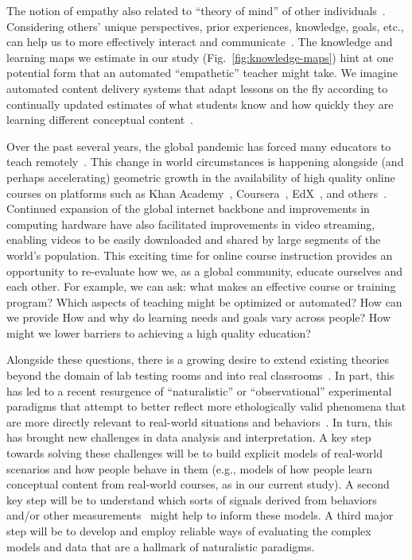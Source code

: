 \documentclass[10pt]{article}
\begin{document}
The notion of empathy also related to ``theory of mind'' of other
individuals~\citep{GoldWinn12, KansEtal15, Melt11}. Considering others' unique
perspectives, prior experiences, knowledge, goals, etc., can help us to more
effectively interact and communicate~\citep{ShaoEtal18, StepBaer06, Ratk18}.
The knowledge and learning maps we estimate in our study
(Fig.~\ref{fig:knowledge-maps}) hint at one potential form that an automated
``empathetic'' teacher might take. We imagine automated content delivery
systems that adapt lessons on the fly according to continually updated
estimates of what students know and how quickly they are learning different
conceptual content~\citep[e.g., building on ideas such as][and
others]{AndeSkwa86, Half88, Kuma05, WolzEtal88}.

Over the past several years, the global pandemic has forced many educators to
teach remotely~\citep{MoseEtal21, ShimLee20, KawaEtal21, Whal20}. This change
in world circumstances is happening alongside (and perhaps accelerating)
geometric growth in the availability of high quality online courses on
platforms such as Khan Academy~\citep{Khan04}, Coursera~\citep{Youn12},
EdX~\citep{Kolo13}, and others~\citep{RhoaEtal13}. Continued expansion of the
global internet backbone and improvements in computing hardware have also
facilitated improvements in video streaming, enabling videos to be easily
downloaded and shared by large segments of the world's population. This
exciting time for online course instruction provides an opportunity to
re-evaluate how we, as a global community, educate ourselves and each other.
For example, we can ask: what makes an effective course or training program?
Which aspects of teaching might be optimized or automated? How can we provide  How and why do
learning needs and goals vary across people? How might we lower barriers to
achieving a high quality education?

Alongside these questions, there is a growing desire to extend existing
theories beyond the domain of lab testing rooms and into real
classrooms~\citep{Kauf03}. In part, this has led to a recent resurgence of
``naturalistic'' or ``observational'' experimental paradigms that attempt to
better reflect more ethologically valid phenomena that are more directly
relevant to real-world situations and behaviors~\citep{NastEtal20}. In turn,
this has brought new challenges in data analysis and interpretation. A key step
towards solving these challenges will be to build explicit models of real-world
scenarios and how people behave in them (e.g., models of how people learn
conceptual content from real-world courses, as in our current study). A second
key step will be to understand which sorts of signals derived from behaviors
and/or other measurements~\citep[e.g., neurophysiological data; ][]{NguyEtal22,
MeshEtal20, PoulEtal17, BeviEtal19, DikkEtal17} might help to inform these
models. A third major step will be to develop and employ reliable ways of
evaluating the complex models and data that are a hallmark of naturalistic
paradigms.
\end{document}
